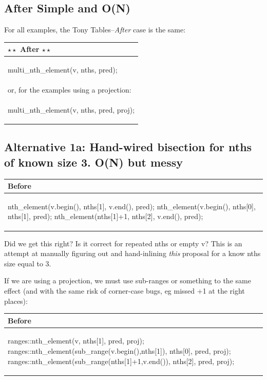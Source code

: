 \subsection*{After \textnormal{ Simple and O(N)}}

For all examples, the Tony Tables--\emph{After} case is the same:\newline

\hspace{3ex}\begin{tabular}{|l|} 
  \hline 
  \textbf{$\star \star$ After $\star \star$} \\
  \hline 
\begin{codeblock} 
multi_nth_element(v, nths, pred);
\end{codeblock}\\[1em]
or, for the examples using a projection:
\\
\begin{codeblock} 
multi_nth_element(v, nths, pred, proj);
\end{codeblock} 
\\
\hline 
\end{tabular} 


\subsection*{Alternative 1a: Hand-wired bisection for nths of known size 3. O(N) but messy}

\hspace{3ex}\begin{tabular}{|l|} 
  \hline 
  \textbf{Before} \\
  \hline 
\begin{codeblock} 
nth_element(v.begin(), nths[1], v.end(), pred);
nth_element(v.begin(), nths[0], nths[1], pred);
nth_element(nths[1]+1, nths[2], v.end(), pred);
\end{codeblock} 
\\
\hline 
\end{tabular} 

Did we get this right? Is it correct for repeated nths or empty v?
This is an attempt at manually figuring out and hand-inlining \emph{this} proposal for a know nths size equal to 3.

If we are using a projection, we must use sub-ranges or something to the same effect (and with the same risk of corner-case bugs, eg missed +1 at the right places):

\hspace{3ex}\begin{tabular}{|l|} 
  \hline 
  \textbf{Before} \\
  \hline 
\begin{codeblock} 
ranges::nth_element(v, nths[1], pred, proj);
ranges::nth_element(sub_range(v.begin(),nths[1]), nths[0], pred, proj);
ranges::nth_element(sub_range(nths[1]+1,v.end()), nths[2], pred, proj);
\end{codeblock} 
\\
\hline 
\end{tabular} 
